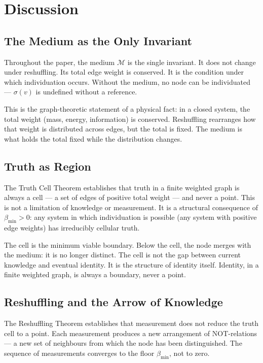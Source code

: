 \documentclass[12pt, a4paper]{article}
\theoremstyle{plain}
\theoremstyle{definition}
\theoremstyle{remark}
\newcommand{\med}{\mathcal{M}}
\newcommand{\bmin}{\beta_{\min}}
\begin{document}
\section{Discussion}
\label{sec:discussion}

\subsection{The Medium as the Only Invariant}

Throughout the paper, the medium $\med$ is the single invariant. It does not
change under reshuffling. Its total edge weight is conserved. It is the
condition under which individuation occurs. Without the medium, no node can
be individuated --- $\sigma(v)$ is undefined without a reference.

This is the graph-theoretic statement of a physical fact: in a closed system,
the total weight (mass, energy, information) is conserved. Reshuffling
rearranges how that weight is distributed across edges, but the total is fixed.
The medium is what holds the total fixed while the distribution changes.

\subsection{Truth as Region}

The Truth Cell Theorem establishes that truth in a finite weighted graph is
always a cell --- a set of edges of positive total weight --- and never a
point. This is not a limitation of knowledge or measurement. It is a structural
consequence of $\bmin > 0$: any system in which individuation is possible
(any system with positive edge weights) has irreducibly cellular truth.

The cell is the minimum viable boundary. Below the cell, the node merges
with the medium: it is no longer distinct. The cell is not the gap between
current knowledge and eventual identity. It is the structure of identity
itself. Identity, in a finite weighted graph, is always a boundary, never
a point.

\subsection{Reshuffling and the Arrow of Knowledge}

The Reshuffling Theorem establishes that measurement does not reduce the
truth cell to a point. Each measurement produces a new arrangement of
NOT-relations --- a new set of neighbours from which the node has been
distinguished. The sequence of measurements converges to the floor $\bmin$,
not to zero.
\end{document}
